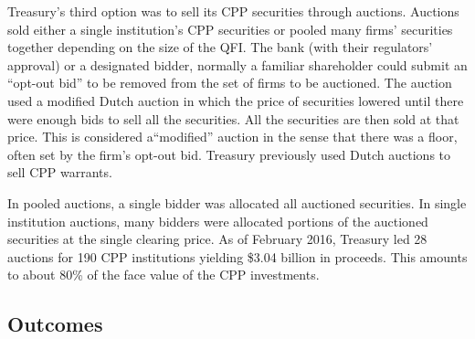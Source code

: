 \documentclass[12pt]{article}
\begin{document}
Treasury's third option was to sell its CPP securities through auctions. Auctions sold either a single institution's CPP securities or pooled many firms' securities together depending on the size of the QFI. The bank (with their regulators' approval) or a designated bidder, normally a familiar shareholder could submit an ``opt-out bid'' to be removed from the set of firms to be auctioned. The auction used a modified Dutch auction in which the price of securities lowered until there were enough bids to sell all the securities. All the securities are then sold at that price. This is considered a``modified'' auction in the sense that there was a floor, often set by the firm's opt-out bid. Treasury previously used Dutch auctions to sell CPP warrants. 

In pooled auctions, a single bidder was allocated all auctioned securities. In single institution auctions, many bidders were allocated portions of the auctioned securities at the single clearing price. As of February 2016, Treasury led 28 auctions for 190 CPP institutions yielding \$3.04 billion in proceeds. This amounts to about 80\% of the face value of the CPP investments. 

\subsection{Outcomes} 
\end{document}

